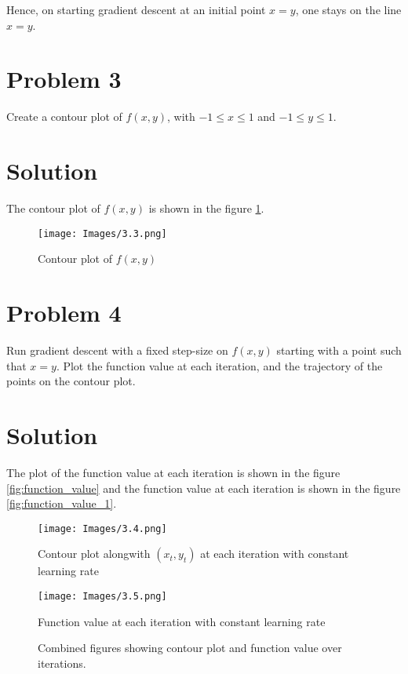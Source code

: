 \documentclass{article}
\begin{document}
Hence, on starting gradient descent at an initial point $x = y$, one stays on the line $x = y$.

\section*{Problem 3}

Create a contour plot of $f(x, y)$, with $-1 \leq x \leq 1$ and $-1 \leq y \leq 1$.

\section*{Solution}

The contour plot of $f(x, y)$ is shown in the figure \ref{fig:contour_plot}.

\begin{figure}
    \centering
    \texttt{[image: Images/3.3.png]}
    \caption{Contour plot of $f(x, y)$}
    \label{fig:contour_plot}
\end{figure}

\section*{Problem 4}

Run gradient descent with a fixed step-size on $f(x, y)$ starting with a point such that $x = y$. Plot the function value at each iteration, and the trajectory of the points on the contour plot.

\section*{Solution}

The plot of the function value at each iteration is shown in the figure \ref{fig:function_value} and the function value at each iteration is shown in the figure \ref{fig:function_value_1}.

\begin{figure}[ht]
    \centering
    \begin{minipage}{0.5\textwidth}
        \centering
        \texttt{[image: Images/3.4.png]}
        \caption{Contour plot alongwith $(x_t, y_t)$ at each iteration with constant learning rate}
        \label{fig:function_value}
    \end{minipage}\hfill
    \begin{minipage}{0.5\textwidth}
        \centering
        \texttt{[image: Images/3.5.png]}
        \caption{Function value at each iteration with constant learning rate}
        \label{fig:function_value_1}
    \end{minipage}
    \caption{Combined figures showing contour plot and function value over iterations.}
    \label{fig:combined_figures}
\end{figure}
\end{document}
